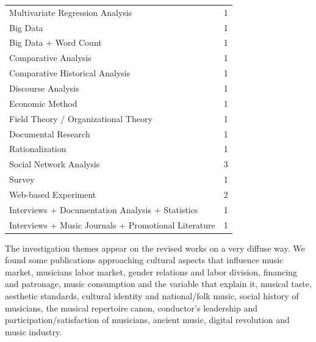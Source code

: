 \documentclass[a4paper, 12pt, openright, oneside, german, french, brazil, english]{abntex2}
\begin{document}
	\begin{table}[ht]
		{\begin{tabular}{lr}
				\hline
				\hline
				Multivariate Regression Analysis &   1 \\ 
				Big Data &   1 \\ 
				Big Data + Word Count &   1 \\ 
				Comparative Analysis &   1 \\ 
				Comparative Historical Analysis &   1 \\ 
				Discourse Analysis &   1 \\ 
				Economic Method &   1 \\ 
				Field Theory / Organizational Theory &   1 \\ 
				Documental Research &   1 \\ 
				Rationalization &   1 \\ 
				Social Network Analysis &   3 \\ 
				Survey &   1 \\ 
				Web-based Experiment &   2 \\ 
				Interviews + Documentation Analysis + Statistics  &  1 \\
				Interviews + Music Journals + Promotional Literature &   1 \\ 
				\hline
			\end{tabular}
		}
		{}
	\end{table}
	

	The investigation themes appear on the revised works on a very diffuse way. We found some publications approaching cultural aspects that influence music market, musicians labor market, gender relations and labor division, financing and patronage, music consumption and the variable that explain it, musical taste, aesthetic standards, cultural identity and national/folk music, social history of musicians, the musical repertoire canon,  conductor's leadership and participation/satisfaction of musicians, ancient music, digital revolution and music industry.
\end{document}
